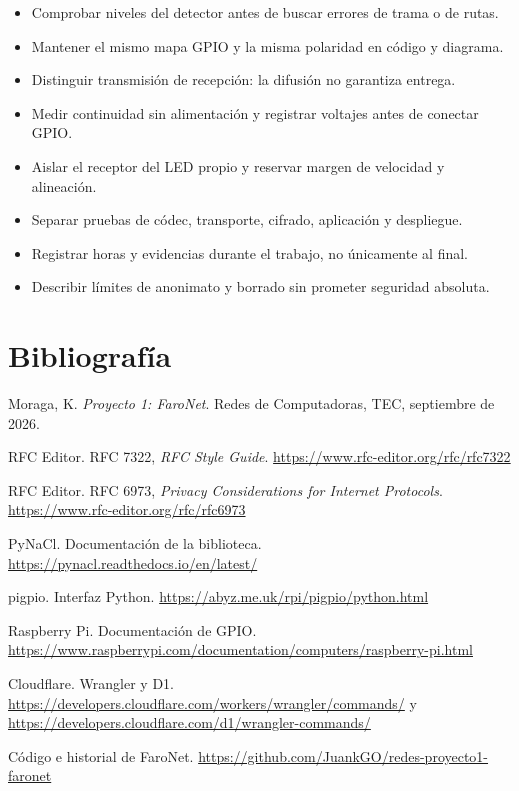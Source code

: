 \documentclass[11pt,letterpaper]{article}
\begin{document}
\begin{itemize}
\item Comprobar niveles del detector antes de buscar errores de trama o de rutas.
\item Mantener el mismo mapa GPIO y la misma polaridad en código y diagrama.
\item Distinguir transmisión de recepción: la difusión no garantiza entrega.
\item Medir continuidad sin alimentación y registrar voltajes antes de conectar GPIO.
\item Aislar el receptor del LED propio y reservar margen de velocidad y alineación.
\item Separar pruebas de códec, transporte, cifrado, aplicación y despliegue.
\item Registrar horas y evidencias durante el trabajo, no únicamente al final.
\item Describir límites de anonimato y borrado sin prometer seguridad absoluta.
\end{itemize}

\section{Bibliografía}

\begin{enumerate}[label={[\arabic*]}]
\item Moraga, K. \emph{Proyecto 1: FaroNet}. Redes de Computadoras, TEC, septiembre de 2026.
\item RFC Editor. RFC 7322, \emph{RFC Style Guide}. \url{https://www.rfc-editor.org/rfc/rfc7322}
\item RFC Editor. RFC 6973, \emph{Privacy Considerations for Internet Protocols}. \url{https://www.rfc-editor.org/rfc/rfc6973}
\item PyNaCl. Documentación de la biblioteca. \url{https://pynacl.readthedocs.io/en/latest/}
\item pigpio. Interfaz Python. \url{https://abyz.me.uk/rpi/pigpio/python.html}
\item Raspberry Pi. Documentación de GPIO. \url{https://www.raspberrypi.com/documentation/computers/raspberry-pi.html}
\item Cloudflare. Wrangler y D1. \url{https://developers.cloudflare.com/workers/wrangler/commands/} y \url{https://developers.cloudflare.com/d1/wrangler-commands/}
\item Código e historial de FaroNet. \url{https://github.com/JuankGO/redes-proyecto1-faronet}
\end{enumerate}
\end{document}
